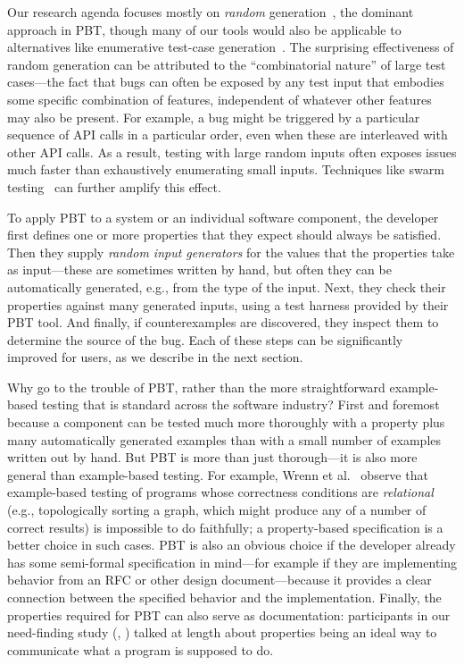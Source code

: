 Our research agenda focuses mostly on {\em random}
generation~\cite{hamlet1994random}, the dominant approach in PBT,
though many of our tools would also be applicable to alternatives
like enumerative test-case
generation~\cite{DBLP:conf/haskell/RuncimanNL08, leancheck}.  The
surprising effectiveness of random generation can be attributed to the
``combinatorial nature'' of large test cases---the fact that bugs can
often be exposed by any test input that embodies some specific combination
of features, independent of whatever other features may also be
present.  For example, a bug might be triggered by a particular
sequence of API calls in a particular order, even when
these are interleaved with other API calls. As a result, testing with
large random inputs often exposes issues much faster than exhaustively
enumerating small inputs.  Techniques like swarm
testing~\cite{groce2012swarm} can further amplify this effect.

To apply PBT to a system or an individual software component, the
developer first defines one
or more properties that they expect should always be satisfied. Then
they supply {\em random input generators} for the values that the
properties take as input---these are sometimes written by hand, but
often they can be automatically generated, e.g., from the type of the
input. Next, they check their properties against many generated
inputs, using a test harness provided by their PBT tool. And finally, if
counterexamples are discovered, they inspect them to determine the
source of the bug.  Each of these steps can be significantly improved for users,
as we describe in the next
section.

\smallskip

Why go to the trouble of PBT, rather than the more straightforward
example-based testing that is standard across the software industry?
First and foremost because a component can be tested much more
thoroughly with a property plus many automatically generated examples
than with a small number of examples written out by hand.
But
PBT is more than just thorough---it is also more general than example-based
testing. For example, Wrenn et al.~\cite{wrenn2021using} observe that example-based testing
of programs whose correctness conditions are {\em relational} (e.g.,
topologically sorting a graph, which might
produce any of a number of correct results) is impossible to do
faithfully; a property-based specification is a better choice in
such cases.
PBT is also
an obvious choice if
the developer already has some semi-formal
specification in mind---for example if they are implementing behavior from an RFC or
other design document---because it provides a clear connection between the
specified behavior and the implementation.
Finally, the
properties required for PBT can also serve as documentation:
participants in our need-finding study (, )
talked at length about properties being an ideal way to communicate what a
program is supposed to do.


